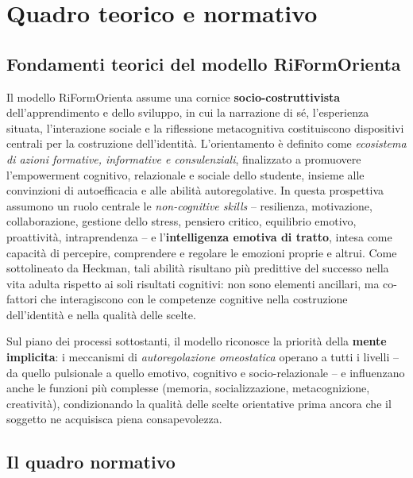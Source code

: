 \documentclass[12pt,a4paper]{article}
\begin{document}
\section{Quadro teorico e normativo}
\label{sec:quadro_teorico}

\subsection{Fondamenti teorici del modello RiFormOrienta}

Il modello RiFormOrienta assume una cornice \textbf{socio-costruttivista} dell'apprendimento e dello sviluppo, in cui la narrazione di s\'e, l'esperienza situata, l'interazione sociale e la riflessione metacognitiva costituiscono dispositivi centrali per la costruzione dell'identit\`a. L'orientamento \`e definito come \textit{ecosistema di azioni formative, informative e consulenziali}, finalizzato a promuovere l'empowerment cognitivo, relazionale e sociale dello studente, insieme alle convinzioni di autoefficacia e alle abilit\`a autoregolative. In questa prospettiva assumono un ruolo centrale le \textit{non-cognitive skills} -- resilienza, motivazione, collaborazione, gestione dello stress, pensiero critico, equilibrio emotivo, proattivit\`a, intraprendenza -- e l'\textbf{intelligenza emotiva di tratto}, intesa come capacit\`a di percepire, comprendere e regolare le emozioni proprie e altrui. Come sottolineato da Heckman, tali abilit\`a risultano pi\`u predittive del successo nella vita adulta rispetto ai soli risultati cognitivi: non sono elementi ancillari, ma co-fattori che interagiscono con le competenze cognitive nella costruzione dell'identit\`a e nella qualit\`a delle scelte.

Sul piano dei processi sottostanti, il modello riconosce la priorit\`a della \textbf{mente implicita}: i meccanismi di \textit{autoregolazione omeostatica} operano a tutti i livelli -- da quello pulsionale a quello emotivo, cognitivo e socio-relazionale -- e influenzano anche le funzioni pi\`u complesse (memoria, socializzazione, metacognizione, creativit\`a), condizionando la qualit\`a delle scelte orientative prima ancora che il soggetto ne acquisisca piena consapevolezza.

\subsection{Il quadro normativo}
\end{document}
